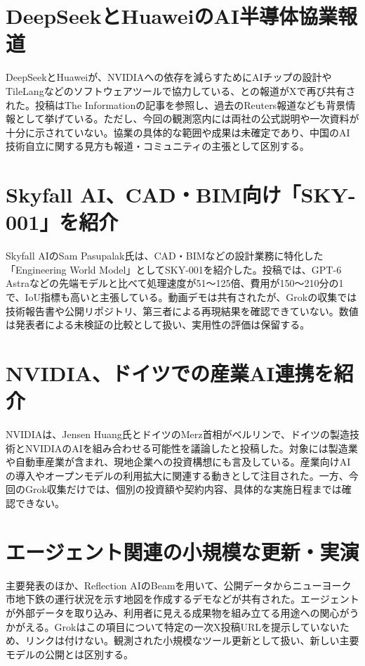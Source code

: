 \section{DeepSeekとHuaweiのAI半導体協業報道}
DeepSeekとHuaweiが、NVIDIAへの依存を減らすためにAIチップの設計やTileLangなどのソフトウェアツールで協力している、との報道がXで再び共有された。投稿はThe Informationの記事を参照し、過去のReuters報道なども背景情報として挙げている。ただし、今回の観測窓内には両社の公式説明や一次資料が十分に示されていない。協業の具体的な範囲や成果は未確定であり、中国のAI技術自立に関する見方も報道・コミュニティの主張として区別する。

\section{Skyfall AI、CAD・BIM向け「SKY-001」を紹介}
Skyfall AIのSam Pasupalak氏は、CAD・BIMなどの設計業務に特化した「Engineering World Model」としてSKY-001を紹介した。投稿では、GPT-6 Astraなどの先端モデルと比べて処理速度が51～125倍、費用が150～210分の1で、IoU指標も高いと主張している。動画デモは共有されたが、Grokの収集では技術報告書や公開リポジトリ、第三者による再現結果を確認できていない。数値は発表者による未検証の比較として扱い、実用性の評価は保留する。

\section{NVIDIA、ドイツでの産業AI連携を紹介}
NVIDIAは、Jensen Huang氏とドイツのMerz首相がベルリンで、ドイツの製造技術とNVIDIAのAIを組み合わせる可能性を議論したと投稿した。対象には製造業や自動車産業が含まれ、現地企業への投資構想にも言及している。産業向けAIの導入やオープンモデルの利用拡大に関連する動きとして注目された。一方、今回のGrok収集だけでは、個別の投資額や契約内容、具体的な実施日程までは確認できない。

\section{エージェント関連の小規模な更新・実演}
主要発表のほか、Reflection AIのBeamを用いて、公開データからニューヨーク市地下鉄の運行状況を示す地図を作成するデモなどが共有された。エージェントが外部データを取り込み、利用者に見える成果物を組み立てる用途への関心がうかがえる。Grokはこの項目について特定の一次X投稿URLを提示していないため、リンクは付けない。観測された小規模なツール更新として扱い、新しい主要モデルの公開とは区別する。
